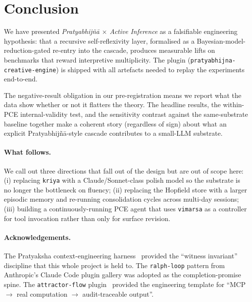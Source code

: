 \section{Conclusion}\label{sec:conclusion}

We have presented \emph{Pratyabhij\~n\=a $\times$ Active Inference} as a falsifiable engineering hypothesis: that a recursive self-reflexivity layer, formalised as a Bayesian-model-reduction-gated re-entry into the cascade, produces measurable lifts on benchmarks that reward interpretive multiplicity. The plugin (\texttt{pratyabhijna-creative-engine}) is shipped with all artefacts needed to replay the experiments end-to-end.

The negative-result obligation in our pre-registration means we report what the data show whether or not it flatters the theory. The headline results, the within-PCE internal-validity test, and the sensitivity contrast against the same-substrate baseline together make a coherent story (regardless of sign) about what an explicit Pratyabhij\~n\=a-style cascade contributes to a small-LLM substrate.

\paragraph{What follows.} We call out three directions that fall out of the design but are out of scope here: (i) replacing \texttt{kriya} with a Claude/Sonnet-class polish model so the substrate is no longer the bottleneck on fluency; (ii) replacing the Hopfield store with a larger episodic memory and re-running consolidation cycles across multi-day sessions; (iii) building a continuously-running PCE agent that uses \texttt{vimarsa} as a controller for tool invocation rather than only for surface revision.

\paragraph{Acknowledgements.} The Pratyaksha context-engineering harness~\citep{PratyakshaContextEng2025} provided the ``witness invariant'' discipline that this whole project is held to. The \texttt{ralph-loop} pattern from Anthropic's Claude Code plugin gallery was adopted as the completion-promise spine. The \texttt{attractor-flow} plugin~\citep{AttractorFlow2025} provided the engineering template for ``MCP $\to$ real computation $\to$ audit-traceable output''.
